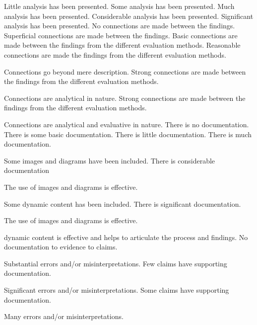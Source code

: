 \documentclass{../fal_assignment}
\begin{document}
\begin{markingrubric}
        \grade 		Little analysis has been presented.
        \grade 		Some analysis has been presented. 
        \grade 		Much analysis has been presented.
        \grade 		Considerable analysis has been presented.
        \grade 		Significant analysis has been presented.
        \grade\fail No connections are made between the findings.
        \grade		Superficial connections are made between the findings.
        \grade		Basic connections are made between the findings from the different evaluation methods.
        \grade		Reasonable connections are made the findings from the different evaluation methods.
        \par		Connections go beyond mere description.
        \grade		Strong connections are made between the findings from the different evaluation methods.
        \par		Connections are analytical in nature.
        \grade		Strong connections are made between the findings from the different evaluation methods.
        \par		Connections are analytical and evaluative in nature.
        \grade\fail There is no documentation. 
        \grade There is some basic documentation.
        \grade There is little documentation.
        \grade There is much documentation.
            \par Some images and diagrams have been included.
        \grade There is considerable documentation
            \par The use of images and diagrams is effective.
            \par Some dynamic content has been included.
        \grade There is significant documentation.
            \par The use of images and diagrams is effective.
            \par dynamic content is effective and helps to articulate the process and findings. 
        \grade\fail 	No documentation to evidence to claims.
        \par 		Substantial errors and/or misinterpretations.
        \grade 		Few claims have supporting documentation.
        \par 		Significant errors and/or misinterpretations.
        \grade 		Some claims have supporting documentation.
        \par 		Many errors and/or misinterpretations.

\end{markingrubric}
\end{document}
